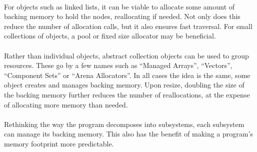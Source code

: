 \documentclass{article}
\begin{document}
\\
For objects such as linked lists, it can be viable to allocate some amount of backing memory to hold the nodes, reallocating if needed. Not only does this reduce the number of allocation calls, but it also ensures fast traversal. For small collections of objects, a pool or fixed size allocator may be beneficial.\\
\\
Rather than individual objects, abstract collection objects can be used to group resources. These go by a few names such as ``Managed Arrays'', ``Vectors'', ``Component Sets'' or ``Arena Allocators''. In all cases the idea is the same, some object creates and manages backing memory. Upon resize, doubling the size of the backing memory further reduces the number of reallocations, at the expense of allocating more memory than needed.\\
\\
Rethinking the way the program decomposes into subsystems, each subsystem can manage its backing memory. This also has the benefit of making a program's memory footprint more predictable.\\
\end{document}
